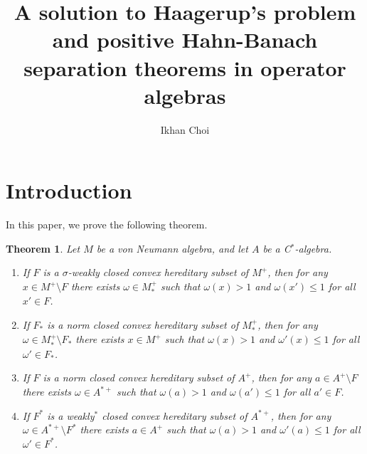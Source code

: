 \documentclass{CUP-JNL-FMP}
\theoremstyle{plain}
\newtheorem*{theorem*}{Theorem}
\theoremstyle{definition}
\begin{document}
\begin{Frontmatter}

\title[Positive Hahn-Banach separation theorems]{A solution to Haagerup's problem and positive Hahn-Banach separation theorems in operator algebras}
\author{Ikhan Choi}
\address{, ; }





\end{Frontmatter}

\localtableofcontents

\section{Introduction}

In this paper, we prove the following theorem.

\begin{theorem*}
Let $M$ be a von Neumann algebra, and let $A$ be a C$^*$-algebra.
\begin{enumerate}[label=(\arabic*)]
\item If $F$ is a $\sigma$-weakly closed convex hereditary subset of $M^+$, then for any $x\in M^+\setminus F$ there exists $\omega\in M_*^+$ such that $\omega(x)>1$ and $\omega(x')\le1$ for all $x'\in F$.
\item If $F_*$ is a norm closed convex hereditary subset of $M_*^+$, then for any $\omega\in M_*^+\setminus F_*$ there exists $x\in M^+$ such that $\omega(x)>1$ and $\omega'(x)\le1$ for all $\omega'\in F_*$.
\item If $F$ is a norm closed convex hereditary subset of $A^+$, then for any $a\in A^+\setminus F$ there exists \qquad\qquad$\omega\in A^{*+}$ such that $\omega(a)>1$ and $\omega(a')\le1$ for all $a'\in F$.
\item If $F^*$ is a weakly$^*$ closed convex hereditary subset of $A^{*+}$, then for any $\omega\in A^{*+}\setminus F^*$ there exists $a\in A^+$ such that $\omega(a)>1$ and $\omega'(a)\le1$ for all $\omega'\in F^*$.
\end{enumerate}
\end{theorem*}
\end{document}
